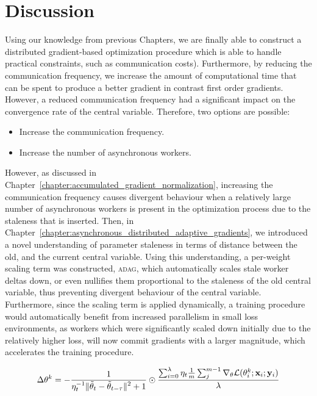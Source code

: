 \section{Discussion}
\label{sec:adag_discussion}

Using our knowledge from previous Chapters, we are finally able to construct a distributed gradient-based optimization procedure which is able to handle practical constraints, such as communication costs). Furthermore, by reducing the communication frequency, we increase the amount of computational time that can be spent to produce a better gradient in contrast first order gradients. However, a reduced communication frequency had a significant impact on the convergence rate of the central variable. Therefore, two options are possible:

\begin{itemize}
\item Increase the communication frequency.
\item Increase the number of asynchronous workers.
\end{itemize}

However, as discussed in Chapter~\ref{chapter:accumulated_gradient_normalization}, increasing the communication frequency causes divergent behaviour when a relatively large number of asynchronous workers is present in the optimization process due to the staleness that is inserted. Then, in Chapter~\ref{chapter:asynchronous_distributed_adaptive_gradients}, we introduced a novel understanding of parameter staleness in terms of distance between the old, and the current central variable. Using this understanding, a per-weight scaling term was constructed, \textsc{adag}, which automatically scales stale worker deltas down, or even nullifies them proportional to the staleness of the old central variable, thus preventing divergent behaviour of the central variable. Furthermore, since the scaling term is applied dynamically, a training procedure would automatically benefit from increased parallelism in small loss environments, as workers which were significantly scaled down initially due to the relatively higher loss, will now commit gradients with a larger magnitude, which accelerates the training procedure.

\begin{equation}
  \label{eq:adag_agn_worker}
  \Delta\theta^k = -\frac{\displaystyle 1}{\displaystyle \eta^{-1}_t\|\tilde{\theta}_t - \tilde{\theta}_{t - \tau}\|^2 + 1} \odot \frac{\sum_{i = 0}^\lambda \eta_t \frac{1}{m}\sum_j^{m - 1} \nabla_\theta \mathcal{L}(\theta^k_i;\mathbf{x}_i;\mathbf{y}_i) }{\lambda}
\end{equation}

